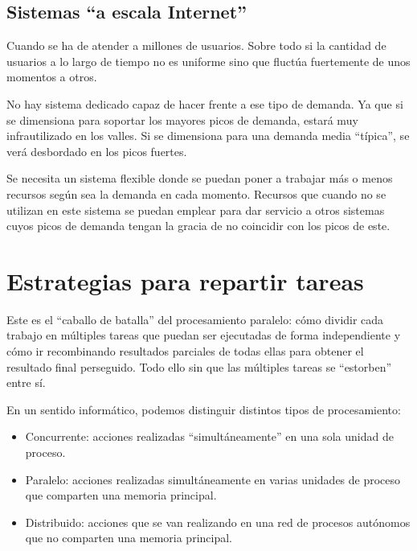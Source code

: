 \documentclass[spanish,12pt,a4paper,final,oneside]{book}
\begin{document}
\subsection{Sistemas ``a escala Internet''}

Cuando se ha de atender a millones de usuarios. Sobre todo si la cantidad de usuarios a lo largo de tiempo no es uniforme sino que fluctúa fuertemente de unos momentos a otros. 

No hay sistema dedicado capaz de hacer frente a ese tipo de demanda. Ya que si se dimensiona para soportar los mayores picos de demanda, estará muy infrautilizado en los valles. Si se dimensiona para una demanda media ``típica'', se verá desbordado en los picos fuertes.

Se necesita un sistema flexible donde se puedan poner a trabajar más o menos recursos según sea la demanda en cada momento. Recursos que cuando no se utilizan en este sistema se puedan emplear para dar servicio a otros sistemas cuyos picos de demanda tengan la gracia de no coincidir con los picos de este.


\section{Estrategias para repartir tareas}

Este es el ``caballo de batalla'' del procesamiento paralelo: cómo dividir cada trabajo en múltiples tareas que puedan ser ejecutadas de forma independiente y cómo ir recombinando resultados parciales de todas ellas para obtener el resultado final perseguido. Todo ello sin que las múltiples tareas se ``estorben'' entre sí.


En un sentido informático, podemos distinguir distintos tipos de procesamiento:

\begin{itemize}

\item Concurrente: acciones realizadas ``simultáneamente'' en una sola unidad de proceso.

\item Paralelo: acciones realizadas simultáneamente en varias unidades de proceso que comparten una memoria principal.

\item Distribuido: acciones que se van realizando en una red de procesos autónomos que no comparten una memoria principal.

\end{itemize}
\end{document}
